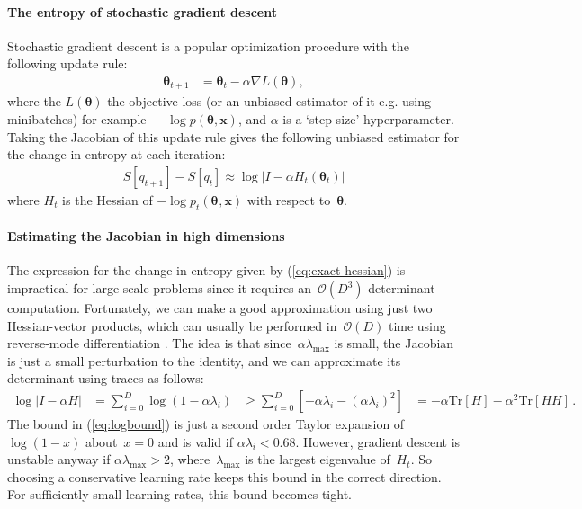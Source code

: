 \documentclass{article} %
\newcommand{\vx}{\mathbf{x}}
\newcommand{\data}{\vx}
\newcommand{\params}{\mathbf{\theta}}
\newcommand{\stepsize}{\alpha}
\newcommand{\jointdist}{p(\params , \data)}
\newcommand{\subjointdist}[2]{p_{#1}(\params_{#2} , \data)}
\newcommand{\bigo}[1]{\mathcal{O}\left(#1\right)}
\newcommand{\trace}[1]{\text{Tr}\left[#1\right]}
\newcommand{\loss}{L(\params)}
\begin{document}
\paragraph{The entropy of stochastic gradient descent}

Stochastic gradient descent is a popular optimization procedure with the following update rule:
%
\begin{align}
\params_{t+1} &=
  \params_t - \stepsize \nabla \loss,
\end{align}
%
where the $\loss$ the objective loss (or an unbiased estimator of it e.g. using minibatches)
for example ~$-\log\jointdist$, and $\stepsize$ is a `step size' hyperparameter.
Taking the Jacobian of this update rule gives the following unbiased estimator
for the change in entropy at each iteration:
%
\begin{align}
S[q_{t+1}] - S[q_t] \approx \log \left| I - \stepsize H_t(\params_t)
\right| \label{eq:exact hessian}
\end{align}
%
where $H_t$ is the Hessian of $-\log\subjointdist{t}{}$ with respect to~$\params$.


\paragraph{Estimating the Jacobian in high dimensions}
\label{sec:scalable-estimator}
The expression for the change in entropy given by (\ref{eq:exact hessian}) is impractical for large-scale problems since it requires an~$\bigo{D^3}$ determinant computation.
Fortunately, we can make a good approximation using just two Hessian-vector products, which can usually be performed in~$\bigo{D}$ time using reverse-mode differentiation \citep{pearlmutter1994fast}.
%
The idea is that since~$\stepsize\lambda_{\text{max}}$ is small, the Jacobian is just a small perturbation to the identity, and we can approximate its determinant using traces as follows:
%
\begin{align}
\log \left| I - \stepsize H \right|
& =    \sum_{i=0}^D \log\left(1 - \stepsize\lambda_i\right) 
& \geq \sum_{i=0}^D \left[- \stepsize\lambda_i 
                        - (\stepsize\lambda_i)^2 \right] \label{eq:logbound} 
& = - \stepsize \trace{H} - \stepsize^2 \trace{HH}\,.
\end{align}
%
The bound in (\ref{eq:logbound}) is just a second order Taylor expansion of~$\log(1 - x)$ about~${x = 0}$ and is valid if ${\stepsize\lambda_i < 0.68}$.
However, gradient descent is unstable anyway if ${\stepsize\lambda_{\text{max}} > 2}$, where~$\lambda_{\text{max}}$ is the largest eigenvalue of~$H_t$.
So choosing a conservative learning rate keeps this bound in the correct direction.
For sufficiently small learning rates, this bound becomes tight.
\end{document}
